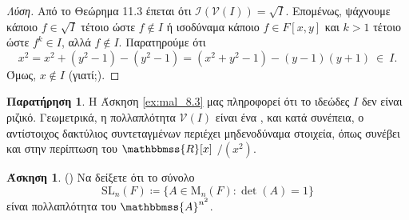 \documentclass[12pt,a4paper,reqno]{amsart}
\theoremstyle{definition}
\newtheorem{exercise}{Άσκηση}
\newtheorem*{remark}{Παρατήρηση}
\renewcommand{\AA}{\mathbbmss{A}}
\newcommand{\RR}{\mathbbmss{R}}
\newcommand{\iI}{\mathcal{I}}
\newcommand{\vV}{\mathcal{V}}
\newcommand{\rmM}{\mathrm{M}}
\newcommand{\SL}{\mathrm{SL}}
\begin{document}
\begin{proof}[Λύση]
  Από το Θεώρημα 11.3 έπεται ότι $\iI(\vV(I)) = \sqrt{I}$. Επομένως, ψάχνουμε κάποιο $f \in \sqrt{I}$ τέτοιο ώστε $f \notin I$ ή ισοδύναμα κάποιο $f \in F[x,y]$ και $k > 1$ τέτοιο ώστε $f^k \in I$, αλλά $f \notin I$. Παρατηρούμε ότι 
  \[
  x^2 = x^2 + (y^2 -1) - (y^2-1) = (x^2 + y^2 -1) - (y-1)(y+1) \ \in \ I.
  \]
  Όμως, $x \notin I$ (γιατί;). 
  
\end{proof}

\begin{remark}
  Η Άσκηση \ref{ex:mal_8.3} μας πληροφορεί ότι το ιδεώδες $I$ δεν είναι ριζικό. Γεωμετρικά, η πολλαπλότητα $\vV(I)$ είναι ένα , και κατά συνέπεια, ο αντίστοιχος δακτύλιος συντεταγμένων περιέχει μηδενοδύναμα στοιχεία, όπως συνέβει και στην περίπτωση του $\RR[x]$ $/(x^2)$.
\end{remark}

\begin{exercise}{\rm(\cite[Άσκηση~15.1.21]{DF04})}
  \label{ex:DF_15.1.21}
  Να δείξετε ότι το σύνολο 
  \[
  \SL_n(F) \coloneqq \{A \in \rmM_n(F) : \det(A) = 1\}
  \]
  είναι πολλαπλότητα του $\AA^{n^2}$.
\end{exercise}
\end{document}
